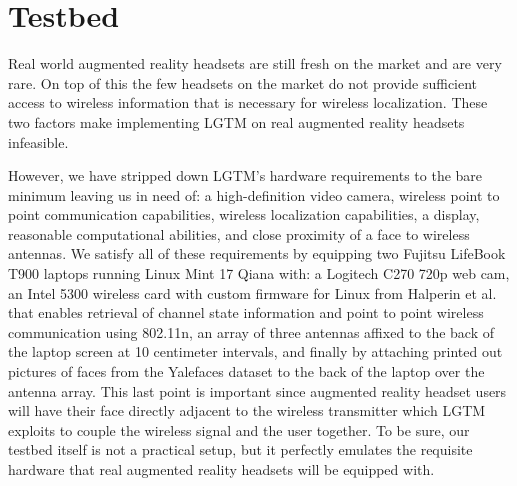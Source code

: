 \documentclass[12pt]{report}
\begin{document}
\section{Testbed}
Real world augmented reality headsets are still fresh on the market and are very rare. On top of this the few headsets on the market do not provide sufficient access to wireless information that is necessary for wireless localization. These two factors make implementing LGTM on real augmented reality headsets infeasible. \par

However, we have stripped down LGTM's hardware requirements to the bare minimum leaving us in need of: a high-definition video camera, wireless point to point communication capabilities, wireless localization capabilities, a display, reasonable computational abilities, and close proximity of a face to wireless antennas. We satisfy all of these requirements by equipping two Fujitsu LifeBook T900 laptops running Linux Mint 17 Qiana with: a Logitech C270 720p web cam, an Intel 5300 wireless card with custom firmware for Linux from Halperin et al. \cite{ChannelStateInformationToolReleaseHalperin2011} that enables retrieval of channel state information and point to point wireless communication using 802.11n, an array of three antennas affixed to the back of the laptop screen at 10 centimeter intervals, and finally by attaching printed out pictures of faces from the Yalefaces dataset \cite{FisherfacesBelhumeur1997} to the back of the laptop over the antenna array. This last point is important since augmented reality headset users will have their face directly adjacent to the wireless transmitter which LGTM exploits to couple the wireless signal and the user together. To be sure, our testbed itself is not a practical setup, but it perfectly emulates the requisite hardware that real augmented reality headsets will be equipped with. \par
\end{document}
